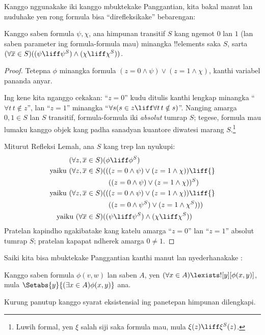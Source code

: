 \documentclass[../../../include/open-logic-section]{subfiles}
\begin{document}
Kanggo nggunakake iki kanggo mbuktekake
Panggantian, kita bakal manut
\citet[perangan kapisan Teorema 2]{Levy1960}
lan nuduhake yen rong formula bisa
``direfleksikake'' bebarengan:

\begin{lem}
Kanggo saben formula $\psi, \chi$, ana
himpunan transitif $S$ kang ngemot $0$ lan
$1$ (lan saben parameter ing formula-formula
mau) minangka !!{element}s saka $S$, sarta
$(\forall \overline{x} \in S)((\psi \liff
\psi^S) \land (\chi \liff \chi^S))$.
\end{lem}

\begin{proof}
Tetepna $\phi$ minangka formula
$(z = 0 \land \psi) \lor (z = 1 \land \chi)$,
kanthi variabel pananda anyar.

Ing kene kita nganggo cekakan: ``$z = 0$''
kudu ditulis kanthi lengkap minangka
``$\forall t\, t \notin z$'', lan ``$z =1$''
minangka ``$\forall s(s \in z \liff
\forall t\, t \notin s)$''. Nanging amarga
$0, 1 \in S$ lan $S$ transitif, formula-formula
iki \emph{absolut} tumrap $S$; tegese,
formula mau lumaku kanggo objek kang padha
sanadyan kuantore diwatesi marang
$S$.\footnote{Luwih formal, yen $\xi$ salah
siji saka formula mau, mula
$\xi(z) \liff \xi^S(z)$.}

Miturut Refleksi Lemah, ana $S$ kang trep
lan nyukupi:
\begin{align*}
	(\forall z, \overline{x} \in S)(&\phi \liff \phi^S)\\
	\text{yaiku }(\forall z, \overline{x} \in S)(&((z = 0 \land \psi) \lor (z = 1 \land \chi)) \liff {}\\
	&\phantom{(}((z = 0 \land \psi) \lor (z = 1 \land \chi))^S)\\
	\text{yaiku }(\forall z, \overline{x} \in S)(&((z = 0 \land \psi) \lor (z = 1 \land \chi))\liff {}\\
	&\phantom{(}((z = 0 \land \psi^S) \lor (z = 1 \land \chi^S)))\\
	\text{yaiku }(\forall \overline{x} \in S)(&(\psi \liff \psi^S) \land (\chi \liff \chi^S))
\end{align*}
Pratelan kapindho ngakibatake kang katelu
amarga ``$z = 0$'' lan ``$z=1$'' absolut
tumrap $S$; pratelan kapapat ndherek amarga
$0 \neq 1$.
\end{proof}\noindent Saiki kita bisa
mbuktekake Panggantian kanthi manut lan
nyederhanakake \citet[Teorema 6]{Levy1960}:

\begin{thm}\label{thm:replacement}
Kanggo saben formula $\phi(v,w)$ lan saben
$A$, yen $(\forall x \in A)\lexists![y][\phi(x,y)]$,
mula $\Setabs{y}{(\exists x \in A)\phi(x,y)}$ ana.
\end{thm}
Kurung panutup kanggo syarat eksistensial ing panetepan himpunan dilengkapi.
\end{document}
